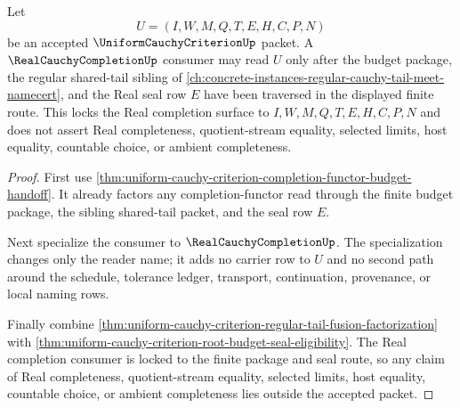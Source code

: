 \begin{theorem}
\label{thm:uniform-cauchy-criterion-real-completion-budget-lock}
Let
$$
U=(I,W,M,Q,T,E,H,C,P,N)
$$
be an accepted $\UniformCauchyCriterionUp$ packet. A $\RealCauchyCompletionUp$ consumer may read $U$ only after the budget package, the regular shared-tail sibling of \autoref{ch:concrete-instances-regular-cauchy-tail-meet-namecert}, and the Real seal row $E$ have been traversed in the displayed finite route. This locks the Real completion surface to $I,W,M,Q,T,E,H,C,P,N$ and does not assert Real completeness, quotient-stream equality, selected limits, host equality, countable choice, or ambient completeness.
\end{theorem}
\begin{proof}
First use \autoref{thm:uniform-cauchy-criterion-completion-functor-budget-handoff}. It already factors any completion-functor read through the finite budget package, the sibling shared-tail packet, and the seal row $E$.

Next specialize the consumer to $\RealCauchyCompletionUp$. The specialization changes only the reader name; it adds no carrier row to $U$ and no second path around the schedule, tolerance ledger, transport, continuation, provenance, or local naming rows.

Finally combine \autoref{thm:uniform-cauchy-criterion-regular-tail-fusion-factorization} with \autoref{thm:uniform-cauchy-criterion-root-budget-seal-eligibility}. The Real completion consumer is locked to the finite package and seal route, so any claim of Real completeness, quotient-stream equality, selected limits, host equality, countable choice, or ambient completeness lies outside the accepted packet.
\end{proof}

